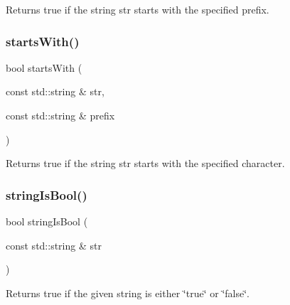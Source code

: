 Returns {\ttfamily true} if the string {\ttfamily str} starts with the specified prefix. 

\mbox{\label{namespacesgl_1_1priv_1_1strlib_a11c9a498274d9d966fdf7a40305a1be9}} 
\subsubsection{\texorpdfstring{starts\+With()}{startsWith()}\hspace{0.1cm}{\footnotesize\ttfamily [2/2]}}
{\footnotesize\ttfamily bool starts\+With (\begin{DoxyParamCaption}\item[{const std\+::string \&}]{str,  }\item[{const std\+::string \&}]{prefix }\end{DoxyParamCaption})}



Returns {\ttfamily true} if the string {\ttfamily str} starts with the specified character. 

\mbox{\label{namespacesgl_1_1priv_1_1strlib_ac05fc94e69329f8d379a801c01105069}} 
\subsubsection{\texorpdfstring{string\+Is\+Bool()}{stringIsBool()}}
{\footnotesize\ttfamily bool string\+Is\+Bool (\begin{DoxyParamCaption}\item[{const std\+::string \&}]{str }\end{DoxyParamCaption})}



Returns true if the given string is either \char`\"{}true\char`\"{} or \char`\"{}false\char`\"{}. 

\mbox{\label{namespacesgl_1_1priv_1_1strlib_a370a1baccb1cc15a675e64b40d9afad6}} 
